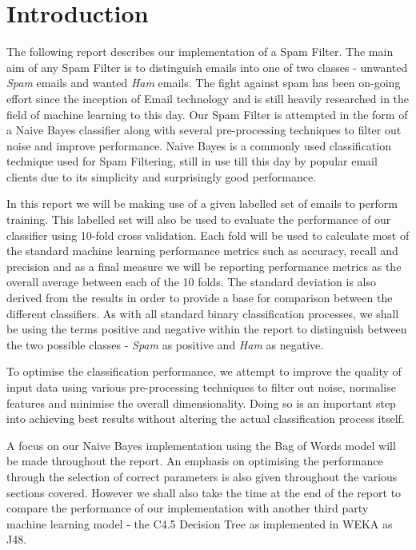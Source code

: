 \section{Introduction}
The following report describes our implementation of a Spam Filter. The main aim of any Spam Filter is to distinguish emails into one of two classes - unwanted \emph{Spam} emails and wanted \emph{Ham} emails. The fight against spam has been on-going effort since the inception of Email technology and is still heavily researched in the field of machine learning to this day. Our Spam Filter is attempted in the form of a Naive Bayes classifier along with several pre-processing techniques to filter out noise and improve performance. Naive Bayes is a commonly used classification technique used for Spam Filtering, still in use till this day by popular email clients due to its simplicity and surprisingly good performance.

In this report we will be making use of a given labelled set of emails to perform training. 
This labelled set will also be used to evaluate the performance of our classifier using 10-fold cross validation. 
Each fold will be used to calculate most of the standard machine learning performance metrics such as accuracy, recall and precision and as a final measure we will be reporting performance metrics as the overall average between each of the 10 folds. 
The standard deviation is also derived from the results in order to provide a base for comparison between the different classifiers.
As with all standard binary classification processes, we shall be using the terms positive and negative within the report to distinguish between the two possible classes - \emph{Spam} as positive and \emph{Ham} as negative.

To optimise the classification performance, we attempt to improve the quality of input data using various pre-processing techniques to filter out noise, normalise features and minimise the overall dimensionality. Doing so is an important step into achieving best results without altering the actual classification process itself.

A focus on our Naive Bayes implementation using the Bag of Words model will be made throughout the report.
An emphasis on optimising the performance through the selection of correct parameters is also given throughout the various sections covered.
However we shall also take the time at the end of the report to compare the performance of our implementation with another third party machine learning model - the C4.5 Decision Tree as implemented in WEKA as J48.

